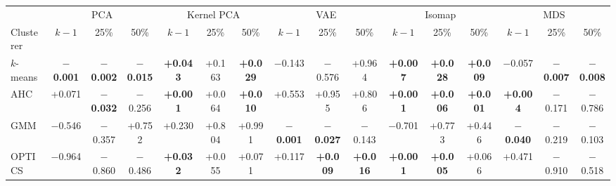 \begin{tabular}{lccccccccccccccc}
\toprule
 & \multicolumn{3}{c}{PCA} & \multicolumn{3}{c}{Kernel PCA} & \multicolumn{3}{c}{VAE} & \multicolumn{3}{c}{Isomap} & \multicolumn{3}{c}{MDS} \\
\cmidrule(lr){2-4} \cmidrule(lr){5-7} \cmidrule(lr){8-10} \cmidrule(lr){11-13} \cmidrule(lr){14-16}
Clusterer & $k-1$ & 25\% & 50\% & $k-1$ & 25\% & 50\% & $k-1$ & 25\% & 50\% & $k-1$ & 25\% & 50\% & $k-1$ & 25\% & 50\% \\
\midrule
$k$-means & {\bfseries\boldmath $-$0.001} & {\bfseries\boldmath $-$0.002} & {\bfseries\boldmath $-$0.015} & {\bfseries\boldmath +0.043} & +0.163 & {\bfseries\boldmath +0.029} & $-$0.143 & $-$0.576 & +0.964 & {\bfseries\boldmath +0.007} & {\bfseries\boldmath +0.028} & {\bfseries\boldmath +0.009} & $-$0.057 & {\bfseries\boldmath $-$0.007} & {\bfseries\boldmath $-$0.008} \\
AHC & +0.071 & {\bfseries\boldmath $-$0.032} & $-$0.256 & {\bfseries\boldmath +0.001} & +0.064 & {\bfseries\boldmath +0.010} & +0.553 & +0.955 & +0.806 & {\bfseries\boldmath +0.001} & {\bfseries\boldmath +0.006} & {\bfseries\boldmath +0.001} & {\bfseries\boldmath +0.004} & $-$0.171 & $-$0.786 \\
GMM & $-$0.546 & $-$0.357 & +0.752 & +0.230 & +0.804 & +0.991 & {\bfseries\boldmath $-$0.001} & {\bfseries\boldmath $-$0.027} & $-$0.143 & $-$0.701 & +0.773 & +0.446 & {\bfseries\boldmath $-$0.040} & $-$0.219 & $-$0.103 \\
OPTICS & $-$0.964 & $-$0.860 & $-$0.486 & {\bfseries\boldmath +0.032} & +0.055 & +0.071 & +0.117 & {\bfseries\boldmath +0.009} & {\bfseries\boldmath +0.016} & {\bfseries\boldmath +0.001} & {\bfseries\boldmath +0.005} & +0.066 & +0.471 & $-$0.910 & $-$0.518 \\
\bottomrule\end{tabular}
